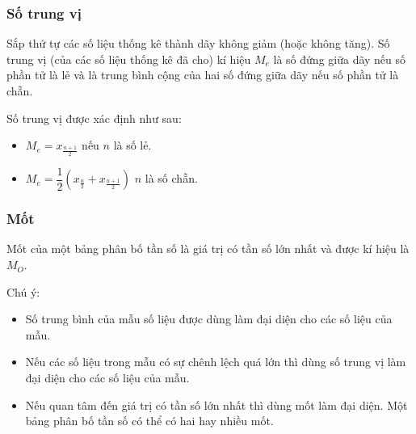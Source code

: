 \subsubsection{Số trung vị}
\begin{dn}[Số trung vị]
Sắp thứ tự các số liệu thống kê thành dãy không giảm (hoặc không tăng). Số trung vị (của các số liệu thống kê đã cho) kí hiệu $M_e$ là số đứng giữa dãy nếu số phần tử là lẻ và là trung bình cộng của hai số đứng giữa dãy nếu số phần tử là chẵn.
\begin{note}
Số trung vị được xác định như sau:
\begin{itemize}
	\item $M_e=x_{\tfrac{n+1}{2}}$  nếu $n$ là số lẻ.
	\item $M_e=\dfrac{1}{2}\left(x_{\tfrac{n}{2}}+x_{\tfrac{n+1}{2}}\right)$ $n$ là số chẵn.
\end{itemize}
\end{note}
\end{dn}
\subsubsection{Mốt}
\begin{dn}[Mốt]
Mốt của một bảng phân bố tần số là giá trị có tần số lớn nhất và được kí hiệu là $M_O$.
\begin{note} Chú ý:
\begin{itemize}
	\item Số trung bình của mẫu số liệu được dùng làm đại diện cho các số liệu của mẫu.
	\item Nếu các số liệu trong mẫu có sự chênh lệch quá lớn thì dùng số trung vị làm đại diện cho các số liệu của mẫu.
	\item Nếu quan tâm đến giá trị có tần số lớn nhất thì dùng mốt làm đại diện. Một bảng phân bố tần số có thể có hai hay nhiều mốt.
\end{itemize}
\end{note}
\end{dn}
